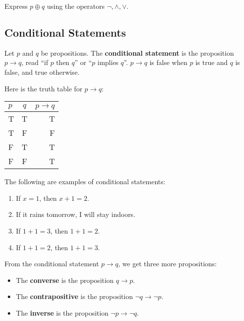 \begin{exercise}
  Express $p\oplus q$ using the operators $\neg,\wedge,\vee$.
\end{exercise}

\subsection{Conditional Statements}

\begin{defn} Let $p$ and $q$ be propositions. The \textbf{conditional
    statement} is the proposition $p\rightarrow q$, read ``if $p$ then
  $q$'' or ``$p$ implies $q$''. $p\rightarrow q$ is false when $p$ is true
  and $q$ is false, and true otherwise.
\end{defn}

Here is the truth table for $p\rightarrow q$:
\begin{table}[h] \centering
  \begin{tabular}{lc|r}
    $p$ & $q$ & $p\rightarrow q$ \\\hline
    T & T & T \\
    T & F & F \\
    F & T & T \\
    F & F & T
  \end{tabular}
\end{table}

\begin{example}
  The following are examples of conditional statements:
  \begin{enumerate}
  \item If $x=1$, then $x+1=2$.
  \item If it rains tomorrow, I will stay indoors.
  \item If $1+1=3$, then $1+1=2$.
  \item If $1+1=2$, then $1+1=3$.
  \end{enumerate}
\end{example}
  
From the conditional statement $p\rightarrow q$, we get three more
propositions:
\begin{itemize}
\item The \textbf{converse} is the proposition $q\rightarrow p$.
\item The \textbf{contrapositive} is the proposition
  $\neg q\rightarrow\neg p$.
\item The \textbf{inverse} is the proposition $\neg p\rightarrow \neg q$.
\end{itemize}

